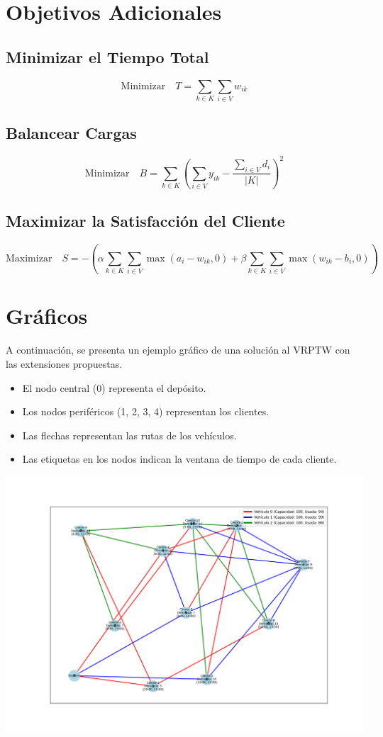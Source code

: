 \documentclass{article}
\begin{document}
\section{Objetivos Adicionales}

\subsection{Minimizar el Tiempo Total}

\[
\text{Minimizar} \quad T = \sum_{k \in K} \sum_{i \in V} w_{ik}
\]

\subsection{Balancear Cargas}

\[
\text{Minimizar} \quad B = \sum_{k \in K} \left( \sum_{i \in V} y_{ik} - \frac{\sum_{i \in V} d_i}{|K|} \right)^2
\]

\subsection{Maximizar la Satisfacción del Cliente}

\[
\text{Maximizar} \quad S = -\left( \alpha \sum_{k \in K} \sum_{i \in V} \max(a_i - w_{ik}, 0) + \beta \sum_{k \in K} \sum_{i \in V} \max(w_{ik} - b_i, 0) \right)
\]

\section{Gráficos}

A continuación, se presenta un ejemplo gráfico de una solución al VRPTW con las extensiones propuestas.

\begin{itemize}
    \item El nodo central (0) representa el depósito.
    \item Los nodos periféricos (1, 2, 3, 4) representan los clientes.
    \item Las flechas representan las rutas de los vehículos.
    \item Las etiquetas en los nodos indican la ventana de tiempo de cada cliente.
\end{itemize}

\begin{center}
\includegraphics[width=1.0\textwidth]{vrptw_large_graph_with_capacity.png}
\end{center}
\end{document}
